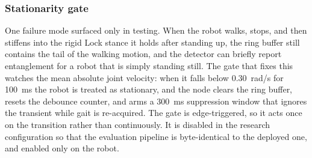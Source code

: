 \subsubsection{Stationarity gate}
One failure mode surfaced only in testing. When the robot walks, stops, and then stiffens into the
rigid Lock stance it holds after standing up, the ring buffer still contains the tail of the walking
motion, and the detector can briefly report entanglement for a robot that is simply standing still.
The gate that fixes this watches the mean absolute joint velocity: when it falls below 0.30~rad/s for
100~ms the robot is treated as stationary, and the node clears the ring buffer, resets the debounce
counter, and arms a 300~ms suppression window that ignores the transient while gait is re-acquired.
The gate is edge-triggered, so it acts once on the transition rather than continuously. It is disabled
in the research configuration so that the evaluation pipeline is byte-identical to the deployed one,
and enabled only on the robot.
